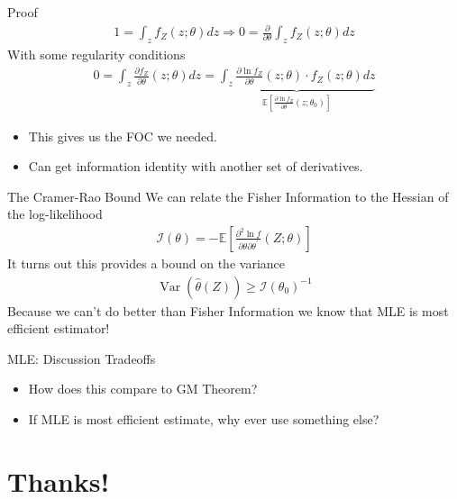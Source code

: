 \documentclass[aspectratio=169]{beamer}
\begin{document}
\begin{frame}{Proof}
\begin{align*}
1 = \int _ { z } f _ { Z } ( z ; \theta ) d z \Rightarrow 0 = \frac { \partial } { \partial \theta } \int _ { z } f _ { Z } ( z ; \theta ) d z
\end{align*}
With some regularity conditions
\begin{align*}
0 = \int _ { z } \frac { \partial f _ { Z } } { \partial \theta } ( z ; \theta ) d z = \underbrace{\int _ { z } \frac { \partial \ln f _ { Z } } { \partial \theta } ( z ; \theta ) \cdot f _ { Z } ( z ; \theta ) d z}_{\mathbb { E } \left[ \frac { \partial \ln f _ { Z } } { \partial \theta } \left( z ; \theta _ { 0 } \right) \right]}
\end{align*}

\begin{itemize}
    \item This gives us the FOC we needed.
    \item Can get information identity with another set of derivatives.
    \end{itemize}
\end{frame}


\begin{frame}{The Cramer-Rao Bound}
We can relate the \alert{Fisher Information} to the Hessian of the log-likelihood
\begin{align*}
\mathcal { I } ( \theta ) = - \mathbb { E } \left[ \frac { \partial ^ { 2 } \ln f } { \partial \theta \partial \theta ^ { \prime } } ( Z ; \theta ) \right]
\end{align*}
It turns out this provides a bound on the variance
\begin{align*}
\operatorname { Var } ( \hat { \theta } ( Z ) ) \geq \mathcal { I } \left( \theta _ { 0 } \right) ^ { - 1 }
\end{align*}
Because we can't do better than Fisher Information we know that MLE is most efficient estimator!
\end{frame}

\begin{frame}{MLE: Discussion}
Tradeoffs
\begin{itemize}
\item How does this compare to GM Theorem?
\item If MLE is most efficient estimate, why ever use something else?
\end{itemize}
\end{frame}




\section*{Thanks!}
\end{document}
